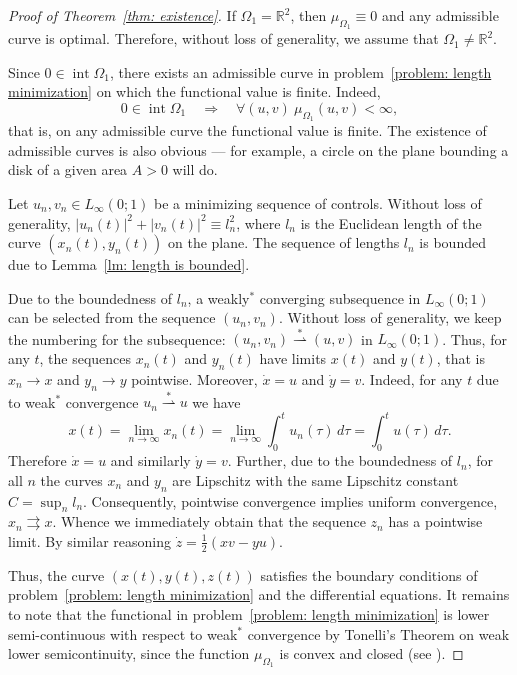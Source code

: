 \documentclass[a4paper,12pt]{article}
\newcommand {\R}{{\mathbb R}}
\theoremstyle{remark}
\theoremstyle{definition}
\begin{document}
\begin{proof}[Proof of Theorem~\ref{thm: existence}]
	
	If $\Omega_1=\R^2$, then $\mu_{\Omega_1}\equiv0$ and any admissible curve is optimal. Therefore, without loss of generality, we assume that $\Omega_1\ne\R^2$.
	
	Since $0\in\operatorname{int}\Omega_1$, there exists an admissible curve in problem~\eqref{problem: length minimization} on which the functional value is finite. Indeed,
	$$
	0\in\operatorname{int}\Omega_1\quad \Longrightarrow\quad \forall (u,v)\ \mu_{\Omega_1}(u,v)<\infty,
	$$
	that is, on any admissible curve the functional value is finite. The existence of admissible curves is also obvious — for example, a circle on the plane bounding a disk of a given area $A>0$ will do.
	
	Let $u_n,v_n\in L_\infty(0;1)$ be a minimizing sequence of controls. Without loss of generality, $|u_n(t)|^2 + |v_n(t)|^2 \equiv l_n^2$, where $l_n$ is the Euclidean length of the curve $(x_n(t),y_n(t))$ on the plane. The sequence of lengths $l_n$ is bounded due to Lemma~\ref{lm: length is bounded}.
	
	
	Due to the boundedness of $l_n$, a weakly$^*$ converging subsequence in $L_\infty(0;1)$ can be selected from the sequence $(u_n,v_n)$. Without loss of generality, we keep the numbering for the subsequence: $(u_n,v_n)\stackrel{\ast}{\rightharpoonup}(u,v)$ in $L_\infty(0;1)$. Thus, for any $t$, the sequences $x_n(t)$ and $y_n(t)$ have limits $x(t)$ and $y(t)$, that is $x_n\to x$ and $y_n\to y$ pointwise. Moreover, $\dot x=u$ and $\dot y=v$. Indeed, for any $t$ due to weak$^*$ convergence $u_n\stackrel{\ast}{\rightharpoonup}u$ we have
	$$
	x(t) = \lim_{n\to\infty} x_n(t) = \lim_{n\to\infty}\int_0^t u_n(\tau)\,d\tau =
	\int_0^t u(\tau)\,d\tau.
	$$
	Therefore $\dot x=u$ and similarly $\dot y=v$. Further, due to the boundedness of $l_n$, for all $n$ the curves $x_n$ and $y_n$ are Lipschitz with the same Lipschitz constant $C=\sup_n l_n$. Consequently, pointwise convergence implies uniform convergence, $x_n\rightrightarrows x$. Whence we immediately obtain that the sequence $z_n$ has a pointwise limit. By similar reasoning $\dot z = \frac12(xv-yu)$.
	
	Thus, the curve $(x(t),y(t),z(t))$ satisfies the boundary conditions of problem~\eqref{problem: length minimization} and the differential equations. It remains to note that the functional in problem~\eqref{problem: length minimization} is lower semi-continuous with respect to weak$^*$ convergence by Tonelli’s Theorem on weak lower semicontinuity, since the function $\mu_{\Omega_1}$ is convex and closed (see \cite{RenardyRogers}).
	
\end{proof}
\end{document}
